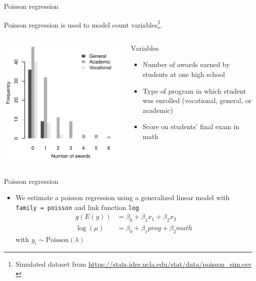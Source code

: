 \documentclass[aspectratio=169]{beamer}
\begin{document}
\begin{frame}{Poisson regression}

Poisson regression is used to model count variables\footnote{Simulated dataset from
  \url{https://stats.idre.ucla.edu/stat/data/poisson_sim.csv} \citep{UCLAstats}}.\\[2ex]
\begin{columns}[c]
\begin{column}{6cm}
  \includegraphics[scale = .65]{../figures/pois_example}
\end{column}
\begin{column}{5cm}
  Variables
  \begin{itemize}
    \item Number of awards earned by students at one high school
    \item Type of program in which student was enrolled (vocational,
    general, or academic)
    \item Score on students' final exam in math
  \end{itemize}
\end{column}
\end{columns}
\end{frame}

\begin{frame}{Poisson regression}
  \begin{itemize}
    \item We estimate a poisson regression using a generalized linear model
      with \texttt{family = poisson} and link function \texttt{log}
  \begin{align*}
    g(E(y)) & = \beta_0 + \beta_1 x_1 + \beta_2 x_2\\
    \log(\mu) & = \beta_0 + \beta_1 prog + \beta_2 math
  \end{align*}
  with $y_i \sim \text{Poisson}(\lambda)$
  \end{itemize}
\end{frame}
\end{document}
